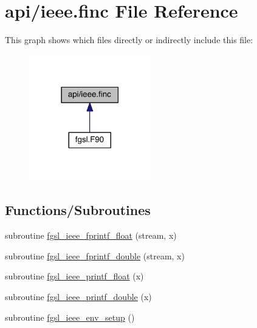 \hypertarget{ieee_8finc}{\section{api/ieee.finc File Reference}
\label{ieee_8finc}
}
This graph shows which files directly or indirectly include this file\-:
\nopagebreak
\begin{figure}[H]
\begin{center}
\leavevmode
\includegraphics[width=150pt]{ieee_8finc__dep__incl}
\end{center}
\end{figure}
\subsection*{Functions/\-Subroutines}
\begin{DoxyCompactItemize}
\item 
subroutine \hyperlink{ieee_8finc_a5656619970e7be3f84c079454cd9977e}{fgsl\-\_\-ieee\-\_\-fprintf\-\_\-float} (stream, x)
\item 
subroutine \hyperlink{ieee_8finc_a3b87a333512c0de9a7093cf0956ca192}{fgsl\-\_\-ieee\-\_\-fprintf\-\_\-double} (stream, x)
\item 
subroutine \hyperlink{ieee_8finc_a61a933397c2e04ae557673fdef8514a7}{fgsl\-\_\-ieee\-\_\-printf\-\_\-float} (x)
\item 
subroutine \hyperlink{ieee_8finc_a3bb5a84b946bdb9d0d3e774759ba0160}{fgsl\-\_\-ieee\-\_\-printf\-\_\-double} (x)
\item 
subroutine \hyperlink{ieee_8finc_af8395e34fef557f25c33ce024526a143}{fgsl\-\_\-ieee\-\_\-env\-\_\-setup} ()
\end{DoxyCompactItemize}


